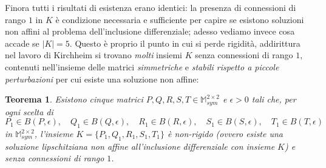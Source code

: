 \documentclass[a4paper,11pt]{book}
\theoremstyle{plain}
\newtheorem{teo}{Teorema}[chapter]
\theoremstyle{definition}
\theoremstyle{remark}
\newcommand{\M}{\mathbb{M}}
\begin{document}
Finora tutti i risultati di esistenza erano identici: la presenza di connessioni di rango $1$ in $K$ è condizione necessaria e sufficiente per capire se esistono soluzioni non affini al problema dell'inclusione differenziale; adesso vediamo invece cosa accade se $|K|=5$. Questo è proprio il punto in cui si perde rigidità, addirittura nel lavoro di Kirchheim \cite{kirchheim} si trovano \textit{molti} insiemi $K$ senza connessioni di rango $1$, contenuti nell'insieme delle matrici \textit{simmetriche} e \textit{stabili rispetto a piccole perturbazioni} per cui esiste una soluzione non affine:
\begin{teo}
	Esistono cinque matrici $P,Q,R,S,T\in\M^{2\times 2}_{sym}$ e $\epsilon>0$ tali che, per ogni scelta di
	\[
		P_{1}\in B(P,\epsilon),\quad Q_{1}\in B(Q,\epsilon),\quad R_{1}\in B(R,\epsilon),\quad S_{1}\in B(S,\epsilon),\quad T_{1}\in B(T,\epsilon)
	\]
	in $\M^{2\times 2}_{sym}$, l'insieme $K=\{P_{1},Q_{1},R_{1},S_{1},T_{1}\}$ è non-rigido (ovvero esiste una soluzione lipschitziana non affine all'inclusione differenziale con insieme $K$) e senza connessioni di rango $1$.
\end{teo}
\end{document}
